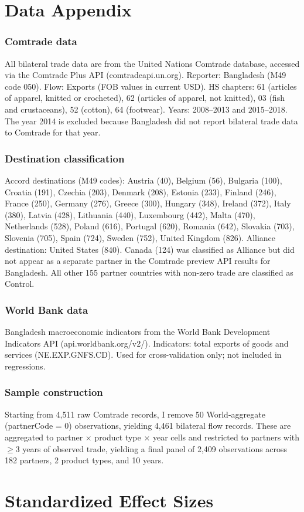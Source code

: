 \documentclass[12pt]{article}
\begin{document}
\label{apep_main_text_end}
\newpage


\newpage
\appendix

\section{Data Appendix}

\subsubsection*{Comtrade data} All bilateral trade data are from the United Nations Comtrade database, accessed via the Comtrade Plus API (comtradeapi.un.org). Reporter: Bangladesh (M49 code 050). Flow: Exports (FOB values in current USD). HS chapters: 61 (articles of apparel, knitted or crocheted), 62 (articles of apparel, not knitted), 03 (fish and crustaceans), 52 (cotton), 64 (footwear). Years: 2008--2013 and 2015--2018. The year 2014 is excluded because Bangladesh did not report bilateral trade data to Comtrade for that year.

\subsubsection*{Destination classification} Accord destinations (M49 codes): Austria (40), Belgium (56), Bulgaria (100), Croatia (191), Czechia (203), Denmark (208), Estonia (233), Finland (246), France (250), Germany (276), Greece (300), Hungary (348), Ireland (372), Italy (380), Latvia (428), Lithuania (440), Luxembourg (442), Malta (470), Netherlands (528), Poland (616), Portugal (620), Romania (642), Slovakia (703), Slovenia (705), Spain (724), Sweden (752), United Kingdom (826). Alliance destination: United States (840). Canada (124) was classified as Alliance but did not appear as a separate partner in the Comtrade preview API results for Bangladesh. All other 155 partner countries with non-zero trade are classified as Control.

\subsubsection*{World Bank data} Bangladesh macroeconomic indicators from the World Bank Development Indicators API (api.worldbank.org/v2/). Indicators: total exports of goods and services (NE.EXP.GNFS.CD). Used for cross-validation only; not included in regressions.

\subsubsection*{Sample construction} Starting from 4,511 raw Comtrade records, I remove 50 World-aggregate (partnerCode = 0) observations, yielding 4,461 bilateral flow records. These are aggregated to partner $\times$ product type $\times$ year cells and restricted to partners with $\geq$3 years of observed trade, yielding a final panel of 2,409 observations across 182 partners, 2 product types, and 10 years.


\section{Standardized Effect Sizes}
\label{sec:sde}


\end{document}
